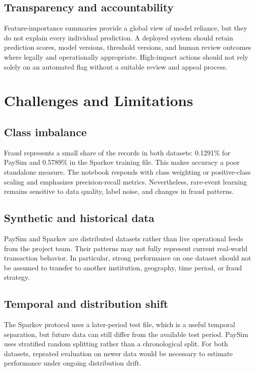 \documentclass[12pt,a4paper]{report}
\begin{document}
\section{Transparency and accountability}
Feature-importance summaries provide a global view of model reliance, but they do not explain every individual prediction. A deployed system should retain prediction scores, model versions, threshold versions, and human review outcomes where legally and operationally appropriate. High-impact actions should not rely solely on an automated flag without a suitable review and appeal process.

\chapter{Challenges and Limitations}
\section{Class imbalance}
Fraud represents a small share of the records in both datasets: 0.1291\% for PaySim and 0.5789\% in the Sparkov training file. This makes accuracy a poor standalone measure. The notebook responds with class weighting or positive-class scaling and emphasizes precision-recall metrics. Nevertheless, rare-event learning remains sensitive to data quality, label noise, and changes in fraud patterns.

\section{Synthetic and historical data}
PaySim and Sparkov are distributed datasets rather than live operational feeds from the project team. Their patterns may not fully represent current real-world transaction behavior. In particular, strong performance on one dataset should not be assumed to transfer to another institution, geography, time period, or fraud strategy.

\section{Temporal and distribution shift}
The Sparkov protocol uses a later-period test file, which is a useful temporal separation, but future data can still differ from the available test period. PaySim uses stratified random splitting rather than a chronological split. For both datasets, repeated evaluation on newer data would be necessary to estimate performance under ongoing distribution drift.
\end{document}
